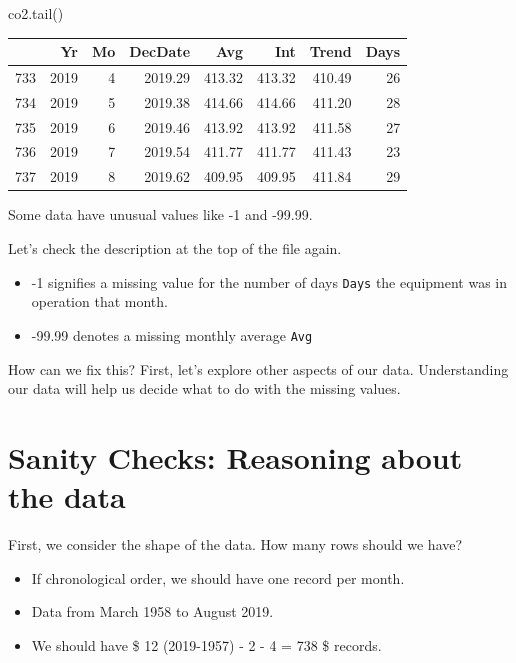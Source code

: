 \documentclass[
  letterpaper,
  DIV=11,
  numbers=noendperiod]{scrreprt}
\newenvironment{Shaded}{\begin{snugshade}}{\end{snugshade}}
\newcommand{\NormalTok}[1]{\textcolor[rgb]{0.00,0.23,0.31}{#1}}
\providecommand{\tightlist}{%
  \setlength{\itemsep}{0pt}\setlength{\parskip}{0pt}}\usepackage{longtable,booktabs,array}
\begin{document}
\begin{Shaded}
\begin{Highlighting}[]
\NormalTok{co2.tail()}
\end{Highlighting}
\end{Shaded}

\begin{tabular}{lrrrrrrr}
\toprule
{} &    Yr &  Mo &  DecDate &    Avg &    Int &  Trend &  Days \\
\midrule
733 &  2019 &   4 &  2019.29 & 413.32 & 413.32 & 410.49 &    26 \\
734 &  2019 &   5 &  2019.38 & 414.66 & 414.66 & 411.20 &    28 \\
735 &  2019 &   6 &  2019.46 & 413.92 & 413.92 & 411.58 &    27 \\
736 &  2019 &   7 &  2019.54 & 411.77 & 411.77 & 411.43 &    23 \\
737 &  2019 &   8 &  2019.62 & 409.95 & 409.95 & 411.84 &    29 \\
\bottomrule
\end{tabular}

Some data have unusual values like -1 and -99.99.

Let's check the description at the top of the file again.

\begin{itemize}
\tightlist
\item
  -1 signifies a missing value for the number of days \texttt{Days} the
  equipment was in operation that month.
\item
  -99.99 denotes a missing monthly average \texttt{Avg}
\end{itemize}

How can we fix this? First, let's explore other aspects of our data.
Understanding our data will help us decide what to do with the missing
values.

\hypertarget{sanity-checks-reasoning-about-the-data}{%
\section{Sanity Checks: Reasoning about the
data}\label{sanity-checks-reasoning-about-the-data}}

First, we consider the shape of the data. How many rows should we have?

\begin{itemize}
\tightlist
\item
  If chronological order, we should have one record per month.
\item
  Data from March 1958 to August 2019.
\item
  We should have \$ 12 \times (2019-1957) - 2 - 4 = 738 \$ records.
\end{itemize}
\end{document}
